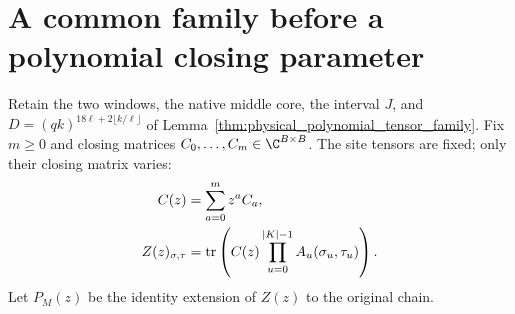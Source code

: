 \section{A common family before a polynomial closing parameter}
\label{sec:common_closing_polynomial_family}

Retain the two windows, the native middle core, the interval $J$, and
$D=(qk)^{18\ell+2\lfloor k/\ell\rfloor}$ of
Lemma~\ref{thm:physical_polynomial_tensor_family}.
Fix $m\geq0$ and closing matrices $C_0,\ldots,C_m\in\C^{B\times B}$.
The site tensors are fixed; only their closing matrix varies:
\begin{align}
    C(z) & =\sum_{a=0}^m z^a C_a,\notag \\
    Z(z)_{\sigma,\tau}
         & =\operatorname{tr}\left(C(z)
    \prod_{u=0}^{|K|-1}A_u(\sigma_u,\tau_u)\right).
    \label{eq:polynomial_closing_matrix}
\end{align}
Let $P_M(z)$ be the identity extension of $Z(z)$ to the original chain.

